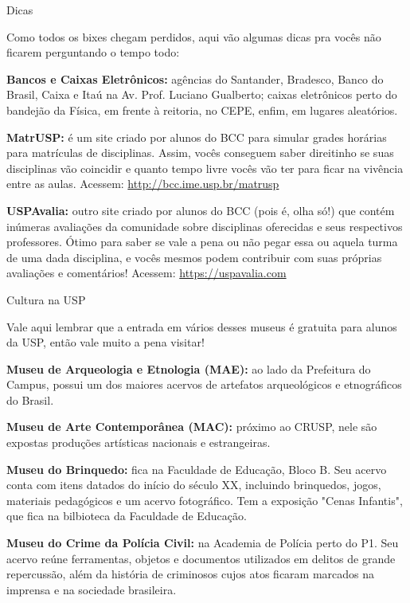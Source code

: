 \begin{secao}{Dicas}

Como todos os bixes chegam perdidos, aqui vão algumas dicas pra vocês não ficarem perguntando o tempo todo:

{\bf Bancos e Caixas Eletrônicos:} agências do Santander, Bradesco,
Banco do Brasil, Caixa e Itaú na Av. Prof. Luciano
Gualberto; caixas eletrônicos perto do bandejão da Física, em frente à reitoria,
no CEPE, enfim, em lugares aleatórios.

{\bf MatrUSP:} é um site criado por alunos do BCC para simular grades horárias
para matrículas de disciplinas. Assim, vocês conseguem saber direitinho se suas
disciplinas vão coincidir e quanto tempo livre vocês vão ter para ficar na
vivência entre as aulas. Acessem: \url{http://bcc.ime.usp.br/matrusp}

{\bf USPAvalia:} outro site criado por alunos do BCC (pois é, olha só!) que
contém inúmeras avaliações da comunidade sobre disciplinas oferecidas e
seus respectivos professores. Ótimo para saber se vale a pena ou não pegar
essa ou aquela turma de uma dada disciplina, e vocês mesmos podem contribuir com
suas próprias avaliações e comentários! Acessem: \url{https://uspavalia.com}

\begin{subsecao}{Cultura na USP}

Vale aqui lembrar que a entrada em vários desses museus é gratuita para alunos da
USP, então vale muito a pena visitar!

{\bf Museu de Arqueologia e Etnologia (MAE):} ao lado da Prefeitura do Campus,
possui um dos maiores acervos de artefatos arqueológicos e etnográficos do Brasil.

{\bf Museu de Arte Contemporânea (MAC):} próximo ao CRUSP, nele são expostas produções
artísticas nacionais e estrangeiras.

{\bf Museu do Brinquedo:} fica na Faculdade de Educação, Bloco B. Seu acervo conta 
com itens datados do início do século XX, incluindo brinquedos, jogos, materiais
pedagógicos e um acervo fotográfico. Tem a exposição "Cenas Infantis", que fica na
bilbioteca da Faculdade de Educação.

{\bf Museu do Crime da Polícia Civil:} na Academia de Polícia perto do P1. Seu acervo
reúne ferramentas, objetos e documentos utilizados em delitos de grande repercussão, 
além da história de criminosos cujos atos ficaram marcados na imprensa e na sociedade
brasileira.


\end{subsecao}
\end{secao}
